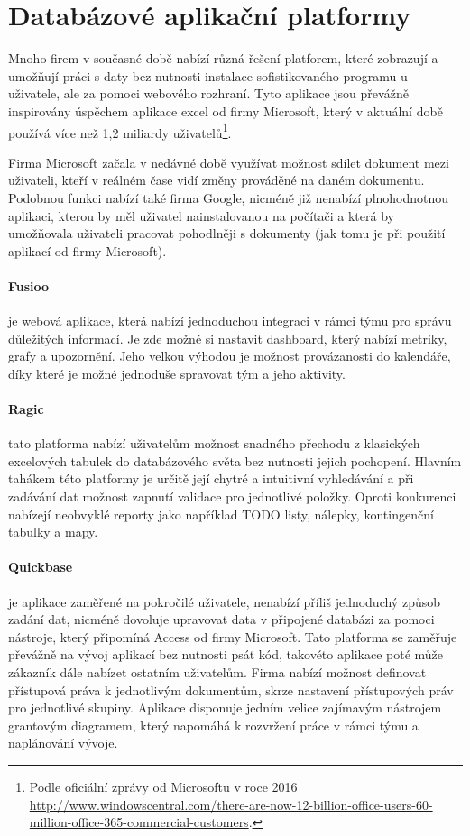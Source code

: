 \section{Databázové aplikační platformy}
\par Mnoho firem v současné době nabízí různá řešení platforem, které zobrazují a umožňují práci s daty bez nutnosti instalace sofistikovaného programu u uživatele, ale za pomoci webového rozhraní. Tyto aplikace jsou převážně inspirovány úspěchem aplikace excel od firmy Microsoft, který v aktuální době používá více než 1,2 miliardy uživatelů\footnote{Podle oficiální zprávy od Microsoftu v roce 2016 \url{http://www.windowscentral.com/there-are-now-12-billion-office-users-60-million-office-365-commercial-customers}.}. \par Firma Microsoft začala v nedávné době využívat možnost sdílet dokument mezi uživateli, kteří v reálném čase vidí změny prováděné na daném dokumentu. Podobnou funkci nabízí také firma Google, nicméně již nenabízí plnohodnotnou aplikaci, kterou by měl uživatel nainstalovanou na počítači a která by umožňovala uživateli pracovat pohodlněji s dokumenty (jak tomu je při použití aplikací od firmy Microsoft).

\paragraph{Fusioo} je webová aplikace, která nabízí jednoduchou integraci v rámci týmu pro správu důležitých informací. Je zde možné si nastavit dashboard, který nabízí metriky, grafy a upozornění. Jeho velkou výhodou je možnost provázanosti do kalendáře, díky které je možné jednoduše spravovat tým a jeho aktivity.

\paragraph{Ragic} tato platforma nabízí uživatelům možnost snadného přechodu z klasických excelových tabulek do databázového světa bez nutnosti jejich pochopení. Hlavním tahákem této platformy je určitě její chytré a intuitivní vyhledávání a při zadávání dat možnost zapnutí validace pro jednotlivé položky. Oproti konkurenci nabízejí neobvyklé reporty jako například TODO listy, nálepky, kontingenční tabulky a mapy.

\paragraph{Quickbase} je aplikace zaměřené na pokročilé uživatele, nenabízí příliš jednoduchý způsob zadání dat, nicméně dovoluje upravovat data v připojené databázi za pomoci nástroje, který připomíná Access od firmy Microsoft. Tato platforma se zaměřuje převážně na vývoj aplikací bez nutnosti psát kód, takovéto aplikace poté může zákazník dále nabízet ostatním uživatelům. Firma nabízí možnost definovat přístupová práva k jednotlivým dokumentům, skrze nastavení přístupových práv pro jednotlivé skupiny. Aplikace disponuje jedním velice zajímavým nástrojem grantovým diagramem, který napomáhá k rozvržení práce v rámci týmu a naplánování vývoje.


